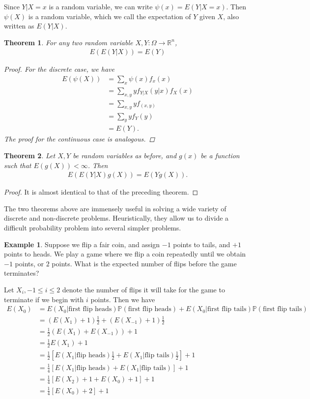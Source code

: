 \documentclass[12pt]{article}
\newcommand{\rr}{\mathbb{R}}
\newcommand{\prob}{\mathbb{P}}
\theoremstyle{plain}
\newtheorem{theorem}{Theorem}
\theoremstyle{definition}
\newtheorem*{example}{Example}
\theoremstyle{remark}
\numberwithin{equation}{section}  %
\begin{document}
Since $Y|X =x$ is a random variable, we can write $\psi(x) = E(Y | X =x)$.
Then $\psi(X)$ is a random variable, which we call the expectation of $Y$ given
$X$, also written as $E(Y|X)$.
\begin{theorem}
	For any two random variable $X,Y: \Omega \to \rr^n$,
	\begin{align*}
		E(E(Y | X)) = E(Y)
	\end{align*}
	\begin{proof}
		For the discrete case, we have
		\begin{align*}
			E(\psi(X)) 
			& = \sum_{x} \psi(x) f_x(x)
			\\
			& = \sum_{x,y} y f_{Y|X}(y|x) f_X(x)
			\\
			& = \sum_{x,y} y f_{(x,y)}
			\\
			& = \sum_y y f_Y(y)
			\\
			& = E(Y).
		\end{align*}
		The proof for the continuous case is analogous. 
	\end{proof}
\end{theorem}
\begin{theorem}
	Let $X,Y$ be random variables as before, and $g(x)$ be a function such that
	$E(g(X))< \infty$. Then
	\begin{align*}
		E(E(Y|X)g(X)) = E(Yg(X)).
	\end{align*}
\end{theorem}
\begin{proof}
	It is almost identical to that of the preceding theorem.
\end{proof}
The two theorems above are immensely useful in solving a wide variety of
discrete and non-discrete problems. Heuristically, they allow us to divide a
difficult probability problem into several simpler problems.
\begin{example}
	Suppose we flip a fair coin, and assign $-1$ points to tails, and $+1$ 
	points to
	heads. We play a game where we flip a coin repeatedly until we obtain
	$-1$ points, or $2$ points. What is the expected number of flips before the
	game terminates? 
\end{example}
Let $X_i, -1 \le i \le 2$ denote the number of flips it will take for the game
to terminate if we begin with $i$ points. Then we have
\begin{align*}
	E(X_0) & = E(X_0 | \text{first flip heads})\prob(\text{first flip heads}) +
	E(X_0 | \text{first flip tails}) \prob(\text{first flip tails})
	\\
	& = (E(X_1) + 1) \frac{1}{2} + (E(X_{-1}) + 1) \frac{1}{2}
	\\
	& = \frac{1}{2}(E(X_1) + E(X_{-1})) + 1
	\\
	& = \frac{1}{2}E(X_1) + 1
	\\
	& = \frac{1}{2}[E(X_1 | \text{flip heads}) \frac{1}{2} + E(X_1 | \text{flip
	tails}) \frac{1}{2}] + 1
	\\
	& = \frac{1}{4}[E(X_1 | \text{flip heads}) + E(X_1 | \text{flip
	tails})] + 1
	\\
	& = \frac{1}{4} [ E(X_2) + 1  + E(X_0) + 1] + 1
	\\
	& = \frac{1}{4}[ E(X_0) + 2] + 1
\end{align*}
\end{document}
